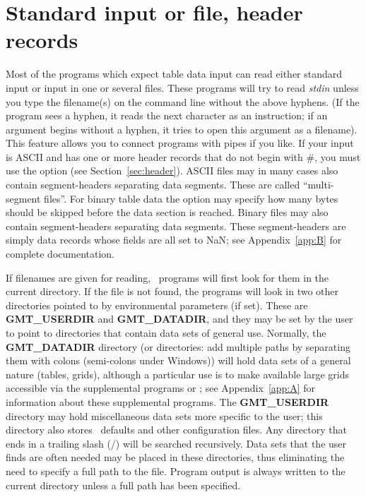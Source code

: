 \section{Standard input or file, header records}

Most of the programs which expect table data input can read
either standard input or input in one or several files.
These programs will try to read \emph{stdin} unless you type
the filename(s) on the command line without the above hyphens.
(If the program sees a hyphen, it reads the next character
as an instruction; if an argument begins without a hyphen,
it tries to open this argument as a filename).
This feature allows you to connect programs with pipes if
you like.  If your input is ASCII and has one or more header
records that do not begin with \#, you must use the 
option (see Section~\ref{sec:header}).
ASCII files may in many cases also contain segment-headers
separating data segments.  These are called ``multi-segment files''.
For binary table data the  option may specify how many bytes should
be skipped before the data section is reached.
Binary files may also contain segment-headers
separating data segments.  These segment-headers are simply data records
whose fields are all set to NaN;
see Appendix~\ref{app:B} for complete documentation. 

If filenames are given for reading, \GMT\ programs will first look for them in the
current directory.  If the file is not found, the programs
will look in two other directories pointed to by environmental
parameters (if set).  These are \textbf{GMT\_USERDIR} and
\textbf{GMT\_DATADIR}, and they may be set by the user to point to directories
that contain data sets of general use.  Normally, the \textbf{GMT\_DATADIR} directory (or directories:
add multiple paths by separating them with colons (semi-colons under Windows)) will
hold data sets of a general nature (tables, grids), although a particular use
is to make available large grids accessible via the supplemental programs 
or ; see Appendix~\ref{app:A} for information
about these supplemental programs.  The \textbf{GMT\_USERDIR} directory may hold miscellaneous
data sets more specific to the user; this directory also stores \GMT\ defaults and other
configuration files.  Any directory that ends in a trailing slash (/) will be searched
recursively.  Data sets that the user finds are often needed
may be placed in these directories, thus eliminating the need to specify
a full path to the file.  Program output is always written to the
current directory unless a full path has been specified.

